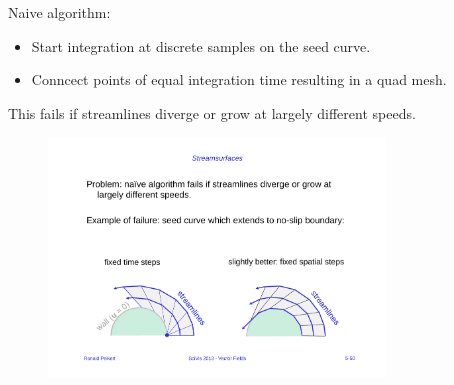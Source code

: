 Naive algorithm:
\begin{itemize}
    \item Start integration at discrete samples on the seed curve.
    \item Conncect points of equal integration time resulting in a quad mesh.
\end{itemize}
This fails if streamlines diverge or grow at largely different speeds.
\begin{figure}[H]
    \centering
    \includegraphics[width=0.8\textwidth]{img/05_streamsurfaces}
\end{figure}

